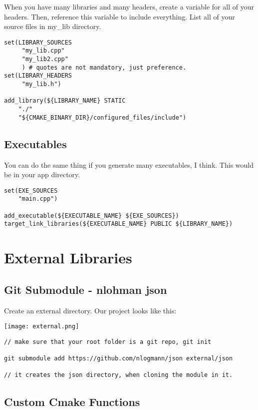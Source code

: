 When you have many libraries and many headers, create a variable for all of your headers.
Then, reference this variable to include everything.
List all of your source files in my\_lib directory.

\begin{verbatim}
set(LIBRARY_SOURCES
     "my_lib.cpp"
     "my_lib2.cpp"
     ) # quotes are not mandatory, just preference.
set(LIBRARY_HEADERS
     "my_lib.h")

add_library(${LIBRARY_NAME} STATIC
    "./"
    "${CMAKE_BINARY_DIR}/configured_files/include")
\end{verbatim}

\subsection{Executables}

You can do the same thing if you generate many executables, I think. This would be in your app directory.

\begin{verbatim}
set(EXE_SOURCES
    "main.cpp")

add_executable(${EXECUTABLE_NAME} ${EXE_SOURCES})
target_link_libraries(${EXECUTABLE_NAME} PUBLIC ${LIBRARY_NAME})
\end{verbatim}


\section{External Libraries}


\subsection{Git Submodule - nlohman json}

Create an external directory. Our project looks like this:

\begin{center}
    \texttt{[image: external.png]}
\end{center}

\begin{verbatim}
// make sure that your root folder is a git repo, git init

git submodule add https://github.com/nlogmann/json external/json

// it creates the json directory, when cloning the module in it.
\end{verbatim}

\subsection{Custom Cmake Functions}

